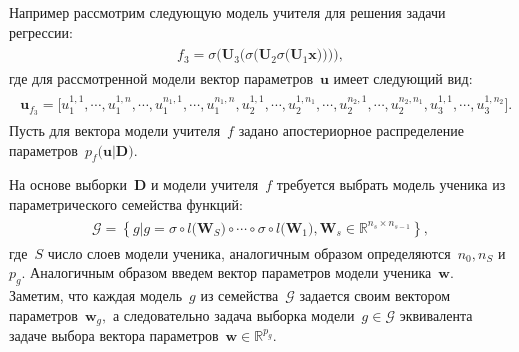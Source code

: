 \documentclass[12pt]{a&t}
\begin{document}
Например рассмотрим следующую модель учителя для решения задачи регрессии:
\begin{gather}
\label{eq:st:3}
\begin{aligned}
f_{3} = \sigma\bigr(\mathbf{U}_3\bigr(\sigma\bigr(\mathbf{U}_2\sigma\bigr(\mathbf{U}_1\mathbf{x}\bigr)\bigr)\bigr)\bigr),
\end{aligned}
\end{gather}
где для рассмотренной модели вектор параметров~$\mathbf{u}$ имеет следующий вид:
\begin{gather}
\label{eq:st:4}
\begin{aligned}
\mathbf{u}_{f_3} = \bigr[u_1^{1,1}, \cdots, u_1^{1,n},
                                               \cdots, 
                             u_1^{n_1,1}, \cdots, u_1^{n_1,n},  
                             u_2^{1, 1}, \cdots, u_2^{1, n_1}, 
                                                \cdots, 
                            u_2^{n_2, 1}, \cdots, u_2^{n_2, n_1},
                            u_3^{1, 1}, \cdots, u_3^{1, n_2}\bigr].
\end{aligned}
\end{gather}
Пусть для вектора модели учителя~$f$ задано апостериорное распределение параметров~$p_f\bigr(\mathbf{u}|\mathbf{D}\bigr).$

На основе выборки~$\mathbf{D}$ и модели учителя~$f$ требуется выбрать модель ученика из параметрического семейства функций:
\begin{gather}
\label{eq:st:5}
\begin{aligned}
\mathcal{G} = \left\{g| g = \sigma \circ l\bigr(\mathbf{W}_S\bigr) \circ \cdots \circ \sigma \circ l\bigr(\mathbf{W}_1\bigr), \mathbf{W}_s \in \mathbb{R}^{n_s \times n_{s-1}} \right\},
\end{aligned}
\end{gather}
где~$S$ число слоев модели ученика, аналогичным образом определяются~$n_0, n_S$ и~$p_g$. Аналогичным образом введем вектор параметров модели ученика~$\mathbf{w}.$ Заметим, что каждая модель~$g$ из семейства~$\mathcal{G}$ задается своим вектором параметров~$\mathbf{w}_g,$ а следовательно задача выборка модели~$g\in\mathcal{G}$ эквивалента задаче выбора вектора параметров~$\mathbf{w}\in\mathbb{R}^{p_g}$.
\end{document}
